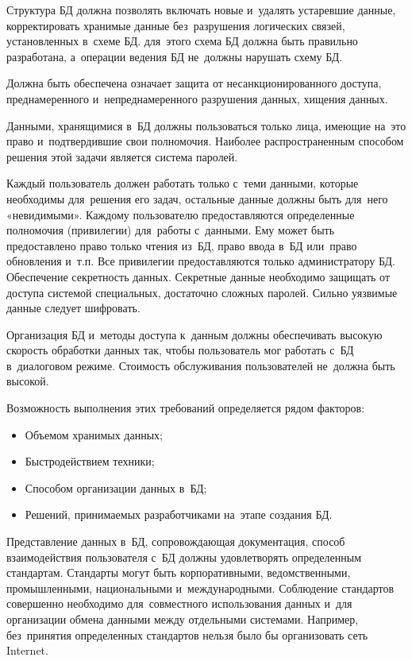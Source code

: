 \documentclass{ou}
\begin{document}
Структура БД должна позволять включать новые и~удалять устаревшие данные, корректировать хранимые данные без~разрушения логических связей, установленных в~схеме БД. для~этого схема БД должна быть правильно разработана, а~операции ведения БД не~должны нарушать схему БД.

Должна быть обеспечена означает защита от несанкционированного доступа, преднамеренного и~непреднамеренного разрушения данных, хищения данных. 

Данными, хранящимися в~БД должны пользоваться только лица, имеющие на~это право и~подтвердившие свои полномочия. Наиболее распространенным способом решения этой задачи является система паролей.

Каждый пользователь должен работать только с~теми данными, которые необходимы для~решения его задач, остальные данные должны быть для~него «невидимыми». Каждому пользователю предоставляются определенные полномочия (привилегии) для~работы с~данными. Ему может быть предоставлено право только чтения из~БД, право ввода в~БД или~право обновления и~т.п. Все привилегии предоставляются только администратору БД. Обеспечение секретность данных. Секретные данные необходимо защищать от доступа системой специальных, достаточно сложных паролей. Сильно уязвимые данные следует шифровать.

Организация БД и~методы доступа к~данным должны обеспечивать высокую скорость обработки данных так, чтобы пользователь мог работать с~БД в~диалоговом режиме. Стоимость обслуживания пользователей не~должна быть высокой.

Возможность выполнения этих требований определяется рядом факторов:
\begin{itemize}[label=-, itemindent=4em, nosep]
\item Объемом хранимых данных;
\item Быстродействием техники;
\item Способом организации данных в~БД;
\item Решений, принимаемых разработчиками на~этапе создания БД.
\end{itemize}

Представление данных в~БД, сопровождающая документация, способ взаимодействия пользователя с~БД должны удовлетворять определенным стандартам. Стандарты могут быть корпоративными, ведомственными, промышленными, национальными и~международными. Соблюдение стандартов совершенно необходимо для~совместного использования данных и~для организации обмена данными между отдельными системами. Например, без~принятия определенных стандартов нельзя было бы организовать сеть Internet.
\end{document}
